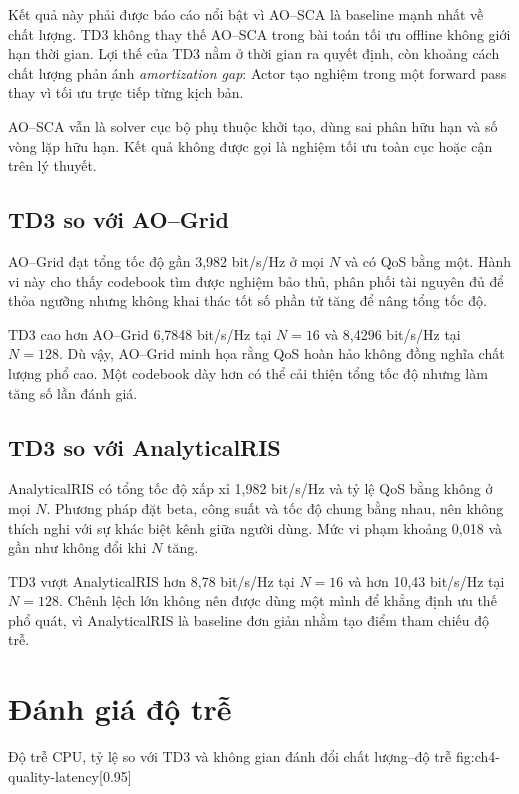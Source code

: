 Kết quả này phải được báo cáo nổi bật vì AO--SCA là baseline mạnh nhất về chất lượng. TD3 không thay thế AO--SCA trong bài toán tối ưu offline không giới hạn thời gian. Lợi thế của TD3 nằm ở thời gian ra quyết định, còn khoảng cách chất lượng phản ánh \emph{amortization gap}: Actor tạo nghiệm trong một forward pass thay vì tối ưu trực tiếp từng kịch bản.

AO--SCA vẫn là solver cục bộ phụ thuộc khởi tạo, dùng sai phân hữu hạn và số vòng lặp hữu hạn. Kết quả không được gọi là nghiệm tối ưu toàn cục hoặc cận trên lý thuyết.

\subsection{TD3 so với AO--Grid}
AO--Grid đạt tổng tốc độ gần 3,982 bit/s/Hz ở mọi $N$ và có QoS bằng một. Hành vi này cho thấy codebook tìm được nghiệm bảo thủ, phân phối tài nguyên đủ để thỏa ngưỡng nhưng không khai thác tốt số phần tử tăng để nâng tổng tốc độ.

TD3 cao hơn AO--Grid 6,7848 bit/s/Hz tại $N=16$ và 8,4296 bit/s/Hz tại $N=128$. Dù vậy, AO--Grid minh họa rằng QoS hoàn hảo không đồng nghĩa chất lượng phổ cao. Một codebook dày hơn có thể cải thiện tổng tốc độ nhưng làm tăng số lần đánh giá.

\subsection{TD3 so với AnalyticalRIS}
AnalyticalRIS có tổng tốc độ xấp xỉ 1,982 bit/s/Hz và tỷ lệ QoS bằng không ở mọi $N$. Phương pháp đặt beta, công suất và tốc độ chung bằng nhau, nên không thích nghi với sự khác biệt kênh giữa người dùng. Mức vi phạm khoảng 0,018 và gần như không đổi khi $N$ tăng.

TD3 vượt AnalyticalRIS hơn 8,78 bit/s/Hz tại $N=16$ và hơn 10,43 bit/s/Hz tại $N=128$. Chênh lệch lớn không nên được dùng một mình để khẳng định ưu thế phổ quát, vì AnalyticalRIS là baseline đơn giản nhằm tạo điểm tham chiếu độ trễ.

\section{Đánh giá độ trễ}


{Độ trễ CPU, tỷ lệ so với TD3 và không gian đánh đổi chất lượng--độ trễ}
{fig:ch4-quality-latency}[0.95\linewidth]

